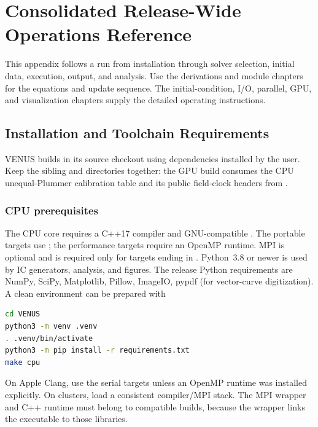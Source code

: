 \appendix
\section{Consolidated Release-Wide Operations Reference}
\label{app:release-operations}

This appendix follows a run from installation through solver selection,
initial data, execution, output, and analysis. Use the derivations and module
chapters for the equations and update sequence. The initial-condition, I/O,
parallel, GPU, and visualization chapters supply the detailed operating
instructions.

\subsection{Installation and Toolchain Requirements}
\label{sec:installation}

VENUS builds in its source checkout using dependencies installed by the
user. Keep the sibling
 and  directories together: the GPU build consumes the
CPU unequal-Plummer calibration table and its public field-clock headers
from .

\subsubsection{CPU prerequisites}

The CPU core requires a C++17 compiler and GNU-compatible .
The portable targets use ; the performance targets require
an OpenMP runtime.  MPI is optional and is required only for targets ending in
.  Python~3.8 or newer is used by IC generators, analysis,
and figures.
The release Python requirements are NumPy, SciPy, Matplotlib, Pillow, ImageIO,
pypdf (for vector-curve digitization).  A clean environment can
be prepared with
\par\noindent\begin{minipage}{\linewidth}
\begin{lstlisting}[language=bash]
cd VENUS
python3 -m venv .venv
. .venv/bin/activate
python3 -m pip install -r requirements.txt
make cpu
\end{lstlisting}
\end{minipage}
On Apple Clang, use the serial targets unless an OpenMP runtime was installed
explicitly.  On clusters, load a consistent compiler/MPI stack. The MPI wrapper and C++
runtime must belong to compatible builds, because the wrapper links the
executable to those libraries.

